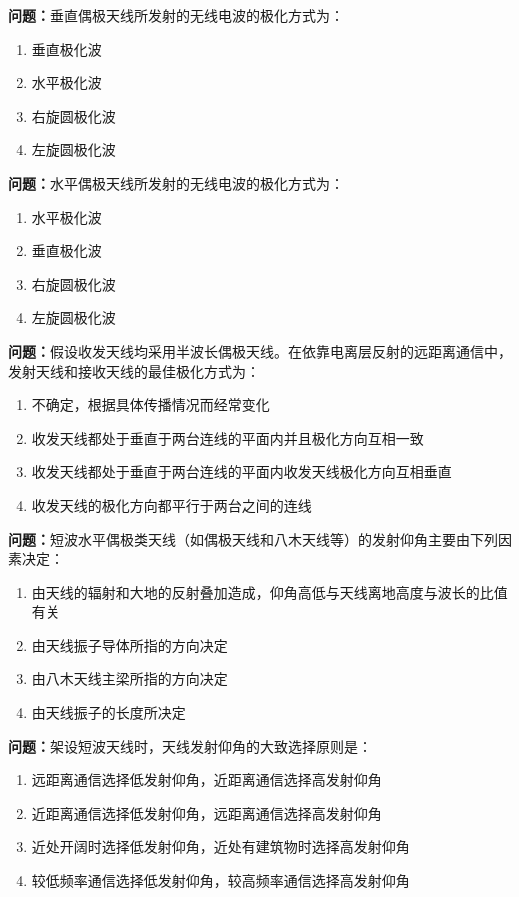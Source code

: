\bigskip


\noindent\textbf{问题：}垂直偶极天线所发射的无线电波的极化方式为：
\begin{enumerate}[label=\Alph*), leftmargin=3em]
\item 垂直极化波
\item 水平极化波
\item 右旋圆极化波
\item 左旋圆极化波
\end{enumerate}

\bigskip


\noindent\textbf{问题：}水平偶极天线所发射的无线电波的极化方式为：
\begin{enumerate}[label=\Alph*), leftmargin=3em]
\item 水平极化波
\item 垂直极化波
\item 右旋圆极化波
\item 左旋圆极化波
\end{enumerate}

\bigskip


\noindent\textbf{问题：}假设收发天线均采用半波长偶极天线。在依靠电离层反射的远距离通信中，发射天线和接收天线的最佳极化方式为：
\begin{enumerate}[label=\Alph*), leftmargin=3em]
\item 不确定，根据具体传播情况而经常变化
\item 收发天线都处于垂直于两台连线的平面内并且极化方向互相一致
\item 收发天线都处于垂直于两台连线的平面内收发天线极化方向互相垂直
\item 收发天线的极化方向都平行于两台之间的连线
\end{enumerate}

\bigskip


\noindent\textbf{问题：}短波水平偶极类天线（如偶极天线和八木天线等）的发射仰角主要由下列因素决定：
\begin{enumerate}[label=\Alph*), leftmargin=3em]
\item 由天线的辐射和大地的反射叠加造成，仰角高低与天线离地高度与波长的比值有关
\item 由天线振子导体所指的方向决定
\item 由八木天线主梁所指的方向决定
\item 由天线振子的长度所决定
\end{enumerate}

\bigskip


\noindent\textbf{问题：}架设短波天线时，天线发射仰角的大致选择原则是：
\begin{enumerate}[label=\Alph*), leftmargin=3em]
\item 远距离通信选择低发射仰角，近距离通信选择高发射仰角
\item 近距离通信选择低发射仰角，远距离通信选择高发射仰角
\item 近处开阔时选择低发射仰角，近处有建筑物时选择高发射仰角
\item 较低频率通信选择低发射仰角，较高频率通信选择高发射仰角
\end{enumerate}

